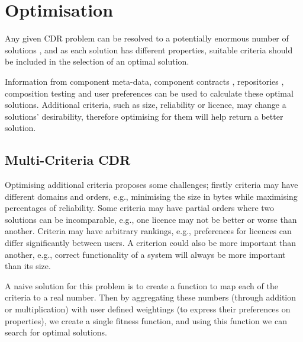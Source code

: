 \section{Optimisation}
Any given CDR problem can be resolved to a potentially enormous number of solutions \cite{Jenson2010},
and as each solution has different properties, suitable criteria should be included in the selection of an optimal solution.

Information from component meta-data, component contracts \cite{Watkins1999}, repositories \cite{Guo2000}, 
composition testing \cite{XuejieZhang2008} and user preferences can be used to calculate these optimal solutions.
Additional criteria, such as size, reliability or licence, may change a solutions' desirability, 
therefore optimising for them will help return a better solution.


\subsection{Multi-Criteria CDR}
Optimising additional criteria proposes some challenges; firstly criteria may have different domains and orders, 
e.g., minimising the size in bytes while maximising percentages of reliability. 
Some criteria may have partial orders where two solutions can be incomparable,
e.g., one licence may not be better or worse than another.
Criteria may have arbitrary rankings, 
e.g., preferences for licences can differ significantly between users.
A criterion could also be more important than another, 
e.g., correct functionality of a system will always be more important than its size.

A naive solution for this problem is to create a function to map each of the criteria to a real number.
Then by aggregating these numbers (through addition or multiplication) with user defined weightings 
(to express their preferences on properties), we create a single fitness function, 
and using this function we can search for optimal solutions.

